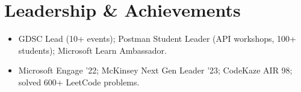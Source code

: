 \documentclass[10pt,a4paper]{article}
\begin{document}
\section*{Leadership \& Achievements}
\begin{itemize}
  \item GDSC Lead (10+ events); Postman Student Leader (API workshops, 100+ students); Microsoft Learn Ambassador.
  \item Microsoft Engage ’22; McKinsey Next Gen Leader ’23; CodeKaze AIR 98; solved 600+ LeetCode problems.
\end{itemize}
\end{document}
